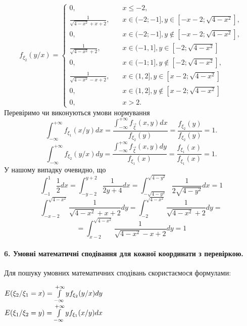 \documentclass[a4paper, 20pt, titlepage]{article}
\begin{document}
\begin{spacing}{1.4}
\begin{equation*}
f_{\xi_2}(y/x)=
    \begin{cases}
    0,\quad & x\leq -2,\\
    \frac{1}{\sqrt{4-x^2}+x+2},\quad &x\in(-2;-1], y\in[-x-2;\sqrt{4-x^2}],\\
    0,\quad &x\in(-2;-1], y\notin[-x-2;\sqrt{4-x^2}],\\
    \frac{1}{\sqrt{4-x^2}+2},\quad &x\in(-1,1], y\in [-2;\sqrt{4-x^2}]\\
    0,\quad &x\in(-1;1], y\notin[-2;\sqrt{4-x^2}],\\
    \frac{1}{\sqrt{4-x^2}-x+2},\quad &x\in(1,2], y\in [x-2;\sqrt{4-x^2}]\\
    0,\quad &x\in(1,2], y\notin [x-2;\sqrt{4-x^2}]\\
    0            ,\quad &x>2.
    \end{cases}
\end{equation*}
Перевіримо чи виконуються умови нормування
\[\int_{-\infty}^{+\infty}f_{\xi_1}(x/y)dx=\frac{\int_{-\infty}^{+\infty} f_{\vec{\xi}}(x,y) dx}{f_{\xi_2}(y)}=\frac{ f_{\xi_2}(y)}{f_{\xi_2}(y)}=1.\]
\[\int_{-\infty}^{+\infty}f_{\xi_2}(y/x)dy=\frac{\int_{-\infty}^{+\infty} f_{\vec{\xi}}(x,y) dy}{f_{\xi_1}(x)}=\frac{ f_{\xi_1}(x)}{f_{\xi_1}(x)}=1.\]
У нашому випадку очевидно, що
\[\int_{-1}^{1}\frac{1}{2} dx=\int_{-y-2}^{y+2}\frac{1}{2y+4} dx=\int_{-\sqrt{4-y^2}}^{\sqrt{4-y^2}}\frac{1}{2\sqrt{4-y^2}} dx=1\]
\[\int_{-x-2}^{\sqrt{4-x^2}}\frac{1}{\sqrt{4-x^2}+x+2} dy=\int_{-2}^{\sqrt{4-x^2}}\frac{1}{\sqrt{4-x^2}+2} dy=\]\[=\int_{x-2}^{\sqrt{4-x^2}}\frac{1}{\sqrt{4-x^2}-x+2} dy=1\]



\paragraph{6. Умовні математичні сподівання для кожної координати з перевіркою.}
\hfill \break

Для пошуку умовних математичних сподівань скористаємося формулами:

\begin{center}
$E(\xi_2/\xi_1 = x) = \int \limits_{-\infty}^{+\infty} y f_{\xi_2}(y/x)dy$ \\ \vspace{5mm}
$E(\xi_1/\xi_2 = y) = \int \limits_{-\infty}^{+\infty} y f_{\xi_1}(x/y)dx$
\end{center}


\end{spacing}
\end{document}
